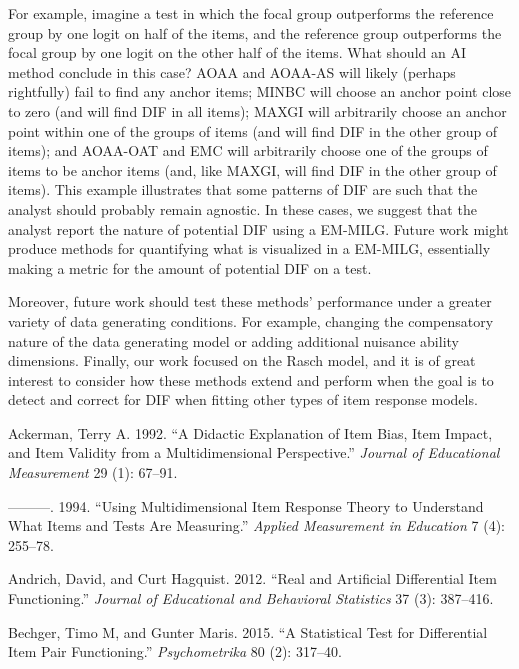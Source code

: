 \documentclass[
  11pt,
]{article}
\begin{document}
For example, imagine a test in which the focal group outperforms the reference group by one logit on half of the items, and the reference group outperforms the focal group by one logit on the other half of the items. What should an AI method conclude in this case? AOAA and AOAA-AS will likely (perhaps rightfully) fail to find any anchor items; MINBC will choose an anchor point close to zero (and will find DIF in all items); MAXGI will arbitrarily choose an anchor point within one of the groups of items (and will find DIF in the other group of items); and AOAA-OAT and EMC will arbitrarily choose one of the groups of items to be anchor items (and, like MAXGI, will find DIF in the other group of items). This example illustrates that some patterns of DIF are such that the analyst should probably remain agnostic. In these cases, we suggest that the analyst report the nature of potential DIF using a EM-MILG. Future work might produce methods for quantifying what is visualized in a EM-MILG, essentially making a metric for the amount of potential DIF on a test.

Moreover, future work should test these methods' performance under a greater variety of data generating conditions. For example, changing the compensatory nature of the data generating model or adding additional nuisance ability dimensions. Finally, our work focused on the Rasch model, and it is of great interest to consider how these methods extend and perform when the goal is to detect and correct for DIF when fitting other types of item response models.

\clearpage




\hypertarget{refs}{}
\leavevmode\hypertarget{ref-ackerman1992didactic}{}%
Ackerman, Terry A. 1992. ``A Didactic Explanation of Item Bias, Item Impact, and Item Validity from a Multidimensional Perspective.'' \emph{Journal of Educational Measurement} 29 (1): 67--91.

\leavevmode\hypertarget{ref-ackerman1994using}{}%
---------. 1994. ``Using Multidimensional Item Response Theory to Understand What Items and Tests Are Measuring.'' \emph{Applied Measurement in Education} 7 (4): 255--78.

\leavevmode\hypertarget{ref-andrich2012real}{}%
Andrich, David, and Curt Hagquist. 2012. ``Real and Artificial Differential Item Functioning.'' \emph{Journal of Educational and Behavioral Statistics} 37 (3): 387--416.

\leavevmode\hypertarget{ref-bechger2015statistical}{}%
Bechger, Timo M, and Gunter Maris. 2015. ``A Statistical Test for Differential Item Pair Functioning.'' \emph{Psychometrika} 80 (2): 317--40.
\end{document}
